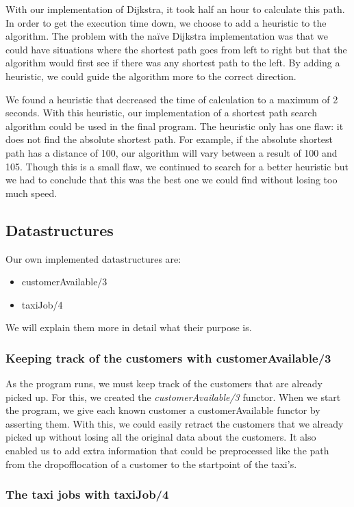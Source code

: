 \documentclass[10pt,a4paper]{article}
\begin{document}
With our implementation of Dijkstra, it took half an hour to calculate this path. In order to get the execution time down, we choose to add a heuristic to the algorithm. The problem with the naïve Dijkstra implementation was that we could have situations where the shortest path goes from left to right but that the algorithm would first see if there was any shortest path to the left. By adding a heuristic, we could guide the algorithm more to the correct direction.

We found a heuristic that decreased the time of calculation to a maximum of 2 seconds. With this heuristic, our implementation of a shortest path search algorithm could be used in the final program. The heuristic only has one flaw: it does not find the absolute shortest path. For example, if the absolute shortest path has a distance of 100, our algorithm will vary between a result of 100 and 105. Though this is a small flaw, we continued to search for a better heuristic but we had to conclude that this was the best one we could find without losing too much speed.

\subsection{Datastructures}

Our own implemented datastructures are:
\begin{itemize}
\item customerAvailable/3
\item taxiJob/4
\end{itemize}
We will explain them more in detail what their purpose is.

\subsubsection{Keeping track of the customers with customerAvailable/3}

As the program runs, we must keep track of the customers that are already picked up. For this, we created the \textit{customerAvailable/3} functor. When we start the program, we give each known customer a customerAvailable functor by asserting them. With this, we could easily retract the customers that we already picked up without losing all the original data about the customers. It also enabled us to add extra information that could be preprocessed like the path from the dropofflocation of a customer to the startpoint of the taxi's.

\subsubsection{The taxi jobs with taxiJob/4}
\end{document}
